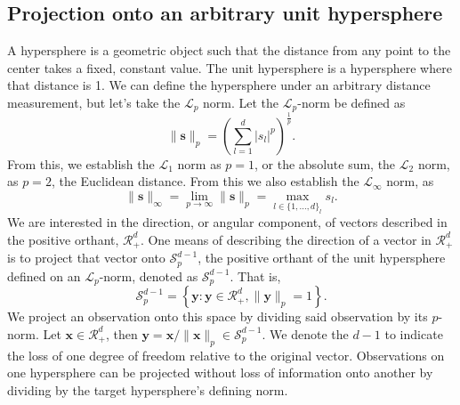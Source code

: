 \subsection{Projection onto an arbitrary unit hypersphere}
A hypersphere is a geometric object such that the distance from any point to the center takes a fixed,
  constant value.  The unit hypersphere is a hypersphere where that distance is 1. We can define the
  hypersphere under an arbitrary distance measurement, but let's take the $\mathcal{L}_p$ norm. Let
  the $\mathcal{L}_p$-norm be defined as
  \begin{equation*}
    \lVert \bm{s} \rVert_p = \left(\sum_{l = 1}^d \lvert s_l\rvert^p\right)^{\frac{1}{p}}.
  \end{equation*}
  From this, we establish the $\mathcal{L}_1$ norm as $p = 1$, or the absolute sum, the
  $\mathcal{L}_2$ norm, as $p = 2$, the Euclidean distance.  From this we also establish the
  $\mathcal{L}_{\infty}$ norm, as
  \begin{equation*}
    \lVert \bm{s} \rVert_{\infty}
      = \lim\limits_{p\to\infty} \lVert \bm{s} \rVert_p
      = \max_{l\in\lbrace1,\ldots,d\rbrace_l}s_l.
  \end{equation*}
  We are interested in the direction, or angular component, of vectors described in the positive
  orthant, $\mathcal{R}_{+}^d$.  One means of describing the direction of a vector in
  $\mathcal{R}_+^d$ is to project that vector onto $\mathcal{S}_{p}^{d-1}$, the positive orthant of
  the unit hypersphere defined on an $\mathcal{L}_p$-norm, denoted as $\mathcal{S}_{p}^{d-1}$.  That is,
  \begin{equation*}
    \mathcal{S}_{p}^{d-1} = \left\lbrace \bm{y} : \bm{y} \in \mathcal{R}_{+}^{d}, \lVert \bm{y}\rVert_{p} = 1\right\rbrace.
  \end{equation*}
  We project an observation onto this space by dividing said observation by its $p$-norm. Let
  $\bm{x}\in \mathcal{R}_{+}^{d}$, then $\bm{y} = \bm{x} / \lVert \bm{x}\rVert_p \in \mathcal{S}_{p}^{d-1}$.
  We denote the $d-1$ to indicate the loss of one degree of freedom relative to the original vector.
  Observations on one hypersphere can be projected without loss of information onto another by
  dividing by the target hypersphere's defining norm.

